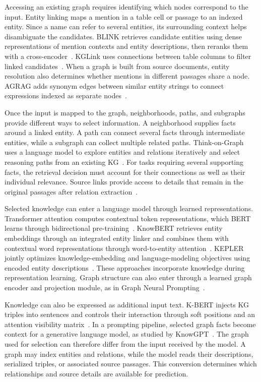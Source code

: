 Accessing an existing graph requires identifying which nodes correspond to the input. Entity linking maps a mention in a table cell or passage to an indexed entity. Since a name can refer to several entities, its surrounding context helps disambiguate the candidates. BLINK retrieves candidate entities using dense representations of mention contexts and entity descriptions, then reranks them with a cross-encoder~\cite{bg-wu2020blink}. KGLink uses connections between table columns to filter linked candidates~\cite{bg-kglink}. When a graph is built from source documents, entity resolution also determines whether mentions in different passages share a node. AGRAG adds synonym edges between similar entity strings to connect expressions indexed as separate nodes~\cite{bg-agrag}.

Once the input is mapped to the graph, neighborhoods, paths, and subgraphs provide different ways to select information. A neighborhood supplies facts around a linked entity. A path can connect several facts through intermediate entities, while a subgraph can collect multiple related paths. Think-on-Graph uses a language model to explore entities and relations iteratively and select reasoning paths from an existing KG~\cite{bg-sun2024tog}. For tasks requiring several supporting facts, the retrieval decision must account for their connections as well as their individual relevance. Source links provide access to details that remain in the original passages after relation extraction~\cite{bg-agrag}.

Selected knowledge can enter a language model through learned representations. Transformer attention computes contextual token representations, which BERT learns through bidirectional pre-training~\cite{bg-transformer,bg-bert}. KnowBERT retrieves entity embeddings through an integrated entity linker and combines them with contextual word representations through word-to-entity attention~\cite{bg-peters2019knowbert}. KEPLER jointly optimizes knowledge-embedding and language-modeling objectives using encoded entity descriptions~\cite{bg-wang2021kepler}. These approaches incorporate knowledge during representation learning. Graph structure can also enter through a learned graph encoder and projection module, as in Graph Neural Prompting~\cite{bg-tian2024gnp}.

Knowledge can also be expressed as additional input text. K-BERT injects KG triples into sentences and controls their interaction through soft positions and an attention visibility matrix~\cite{bg-liu2020kbert}. In a prompting pipeline, selected graph facts become context for a generative language model, as studied by KnowGPT~\cite{lit-zhang2024knowgpt}. The graph used for selection can therefore differ from the input received by the model. A graph may index entities and relations, while the model reads their descriptions, serialized triples, or associated source passages. This conversion determines which relationships and source details are available for prediction.

